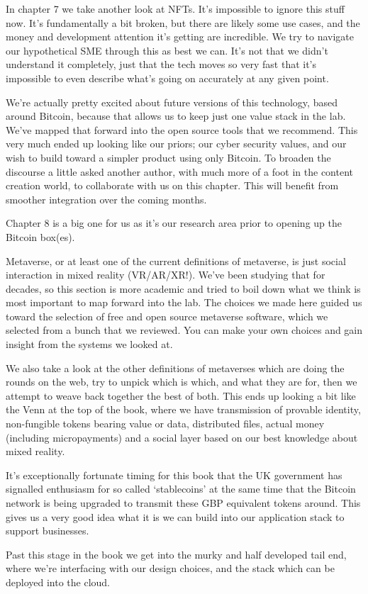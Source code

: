 In chapter 7 we take another look at NFTs. It’s impossible to ignore this stuff now. It’s fundamentally a bit broken, but there are likely some use cases, and the money and development attention it’s getting are incredible. We try to navigate our hypothetical SME through this as best we can. It’s not that we didn’t understand it completely, just that the tech moves so very fast that it’s impossible to even describe what’s going on accurately at any given point. \par
We’re actually pretty excited about future versions of this technology, based around Bitcoin, because that allows us to keep just one value stack in the lab. We’ve mapped that forward into the open source tools that we recommend. This very much ended up looking like our priors; our cyber security values, and our wish to build toward a simpler product using only Bitcoin. To broaden the discourse a little asked another author, with much more of a foot in the content creation world, to collaborate with us on this chapter. This will benefit from smoother integration over the coming months.\par
Chapter 8 is a big one for us as it’s our research area prior to opening up the Bitcoin box(es).\par Metaverse, or at least one of the current definitions of metaverse, is just social interaction in mixed reality (VR/AR/XR!). We’ve been studying that for decades, so this section is more academic and tried to boil down what we think is most important to map forward into the lab. The choices we made here guided us toward the selection of free and open source metaverse software, which we selected from a bunch that we reviewed. You can make your own choices and gain insight from the systems we looked at.\par
We also take a look at the other definitions of metaverses which are doing the rounds on the web, try to unpick which is which, and what they are for, then we attempt to weave back together the best of both. This ends up looking a bit like the Venn at the top of the book, where we have transmission of provable identity, non-fungible tokens bearing value or data, distributed files, actual money (including micropayments) and a social layer based on our best knowledge about mixed reality.\par
It's exceptionally fortunate timing for this book that the UK government has signalled enthusiasm for so called `stablecoins' at the same time that the Bitcoin network is being upgraded to transmit these GBP equivalent tokens around. This gives us a very good idea what it is we can build into our application stack to support businesses.\par 
Past this stage in the book we get into the murky and half developed tail end, where we’re interfacing with our design choices, and the stack which can be deployed into the cloud.


